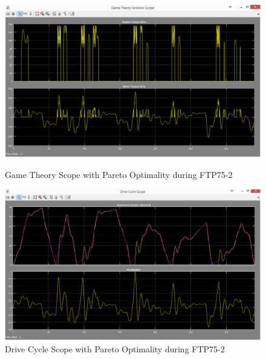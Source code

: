 \begin{figure}[hp]
\centering
\includegraphics[scale=0.45]{figures/Pareto/FTP75-2/gameTheory03Juli}
\caption{Game Theory Scope with Pareto Optimality during FTP75-2}
\label{fig:gtpo2}
\includegraphics[scale=0.41]{figures/Pareto/FTP75-2/driveCycle03Juli}
\caption{Drive Cycle Scope with Pareto Optimality during FTP75-2}
\label{fig:dcpo2}
\end{figure}

